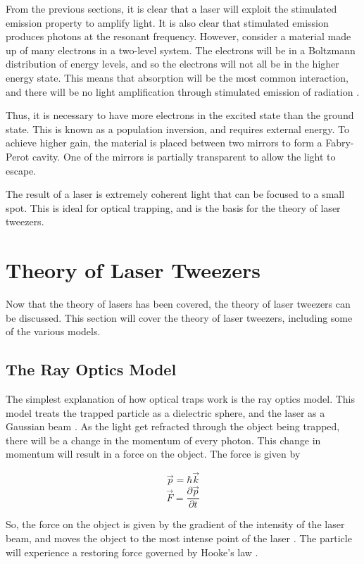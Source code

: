 \documentclass{article}
\newcommand{\p}{\partial}
\begin{document}
From the previous sections, it is clear that a laser will exploit the stimulated emission property to amplify light. It is also clear that stimulated emission produces photons at the resonant frequency. However, consider a material made up of many electrons in a two-level system. The electrons will be in a Boltzmann distribution of energy levels, and so the electrons will not all be in the higher energy state. This means that absorption will be the most common interaction, and there will be no light amplification through stimulated emission of radiation \cite{Griffiths}. 

Thus, it is necessary to have more electrons in the excited state than the ground state. This is known as a population inversion, and requires external energy. To achieve higher gain, the material is placed between two mirrors to form a Fabry-Perot cavity. One of the mirrors is partially transparent to allow the light to escape.

The result of a laser is extremely coherent light that can be focused to a small spot. This is ideal for optical trapping, and is the basis for the theory of laser tweezers.


\section*{Theory of Laser Tweezers}

Now that the theory of lasers has been covered, the theory of laser tweezers can be discussed. This section will cover the theory of laser tweezers, including some of the various models.

\subsection*{The Ray Optics Model}

The simplest explanation of how optical traps work is the ray optics model. This model treats the trapped particle as a dielectric sphere, and the laser as a Gaussian beam \cite{UToronto}. As the light get refracted through the object being trapped, there will be a change in the momentum of every photon. This change in momentum will result in a force on the object. The force is given by \cite{UToronto}

\[ \vec{p} = \hbar \vec{k} \]
\[ \vec{F} = \frac{\p \vec{p}}{\p t} \]

So, the force on the object is given by the gradient of the intensity of the laser beam, and moves the object to the most intense point of the laser \cite{UToronto}. The particle will experience a restoring force governed by Hooke's law \cite{UToronto}.
\end{document}
